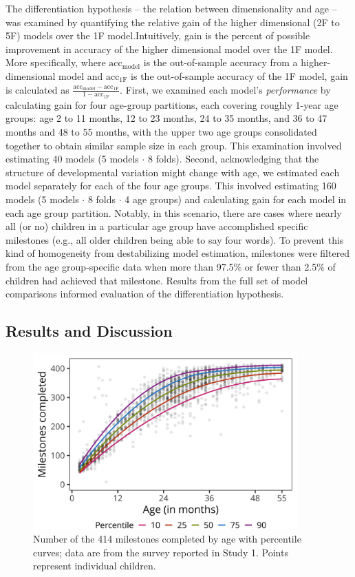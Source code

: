 \documentclass[man, floatsintext]{apa7}
\begin{document}
The differentiation hypothesis -- the relation between dimensionality and age -- was examined by quantifying the relative gain of the higher dimensional (2F to 5F) models over the 1F model.Intuitively, gain is the percent of possible improvement in accuracy of the higher dimensional model over the 1F model. More specifically,
where $\text{acc}_\text{model}$ is the out-of-sample accuracy from a
higher-dimensional model and $\text{acc}_\text{1F}$ is the
out-of-sample accuracy of the 1F model, gain is calculated as
$\frac{\text{acc}_\text{model} - \text{acc}_\text{1F}}{1 - \text{acc}_\text{1F}}$.
First, we examined each model's \emph{performance} by calculating gain for four age-group partitions, each covering roughly 1-year age groups: age 2 to 11 months, 12 to 23 months, 24 to 35 months, and 36 to 47 months and 48 to 55 months, with the upper two age groups consolidated together to obtain similar sample size in each group. This examination involved estimating 40 models (5 models $\cdot$ 8 folds). Second, acknowledging that the structure of developmental variation might change with age, we estimated each model separately for each of the four age groups. This involved estimating 160 models
(5 models $\cdot$ 8 folds $\cdot$ 4 age groups) and calculating gain for each model in each age group partition. Notably, in this scenario, there are cases where nearly all (or no) children in a particular age group have accomplished specific milestones (e.g., all older children being able to say four words). To prevent this kind of homogeneity from destabilizing model estimation, milestones were filtered from the age group-specific data when more than 97.5\% or fewer than 2.5\% of children had achieved that milestone. Results from the full set of model comparisons informed evaluation of the differentiation hypothesis.

\subsection{Results and Discussion}

\begin{figure}
\centering
\includegraphics[width=4in]{figures/01_achieve_by_age.png}
\caption{Number of the 414 milestones completed by age with percentile curves; data are from the survey reported in Study 1. Points represent individual children.}
\label{fig:partage}
\end{figure}
\end{document}
